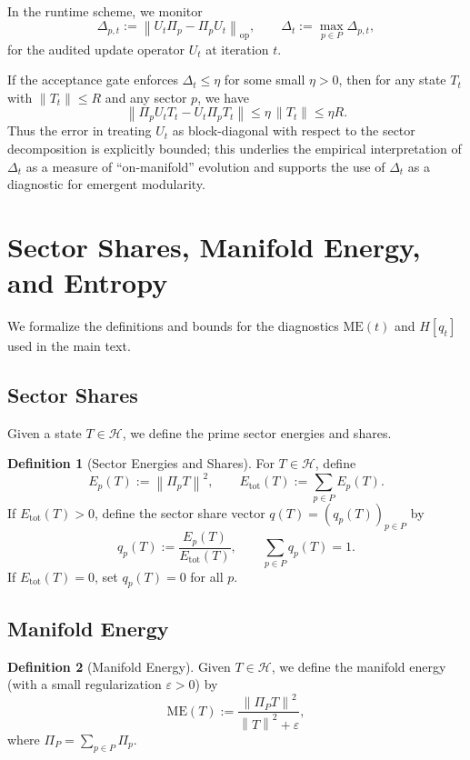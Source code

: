 \documentclass[11pt]{article}
\theoremstyle{definition}
\newtheorem{definition}{Definition}[section]
\theoremstyle{plain}
\theoremstyle{remark}
\newcommand{\Hcal}{\mathcal{H}}
\newcommand{\norm}[1]{\left\lVert #1 \right\rVert}
\begin{document}
In the runtime scheme, we monitor
\[
  \Delta_{p,t} := \norm{U_t \Pi_p - \Pi_p U_t}_{\mathrm{op}},
\qquad \Delta_t := \max_{p\in P} \Delta_{p,t},
\]
for the audited update operator \(U_t\) at iteration \(t\).

If the acceptance gate enforces \(\Delta_t \le \eta\) for some small \(\eta>0\), then for any state \(T_t\) with \(\norm{T_t}\le R\) and any sector \(p\), we have
\[
  \norm{\Pi_p U_t T_t - U_t \Pi_p T_t}
  \le \eta \, \norm{T_t} \le \eta R.
\]
Thus the error in treating \(U_t\) as block-diagonal with respect to the sector decomposition is explicitly bounded; this underlies the empirical interpretation of \(\Delta_t\) as a measure of ``on-manifold'' evolution and supports the use of \(\Delta_t\) as a diagnostic for emergent modularity.

\section{Sector Shares, Manifold Energy, and Entropy}

We formalize the definitions and bounds for the diagnostics
\(\mathrm{ME}(t)\) and \(H[q_t]\) used in the main text.

\subsection{Sector Shares}

Given a state \(T \in \Hcal\), we define the prime sector energies and shares.

\begin{definition}[Sector Energies and Shares]
For \(T \in \Hcal\), define
\[
  E_p(T) := \norm{\Pi_p T}^2,\qquad
  E_{\mathrm{tot}}(T) := \sum_{p\in P} E_p(T).
\]
If \(E_{\mathrm{tot}}(T) > 0\), define the sector share vector \(q(T) = (q_p(T))_{p\in P}\) by
\[
  q_p(T) := \frac{E_p(T)}{E_{\mathrm{tot}}(T)},\qquad \sum_{p\in P} q_p(T) = 1.
\]
If \(E_{\mathrm{tot}}(T)=0\), set \(q_p(T)=0\) for all \(p\).
\end{definition}

\subsection{Manifold Energy}

\begin{definition}[Manifold Energy]
Given \(T \in \Hcal\), we define the manifold energy (with a small regularization \(\varepsilon>0\)) by
\[
  \mathrm{ME}(T)
  := \frac{\norm{\Pi_P T}^2}{\norm{T}^2 + \varepsilon},
\]
where \(\Pi_P = \sum_{p\in P} \Pi_p\).
\end{definition}
\end{document}
